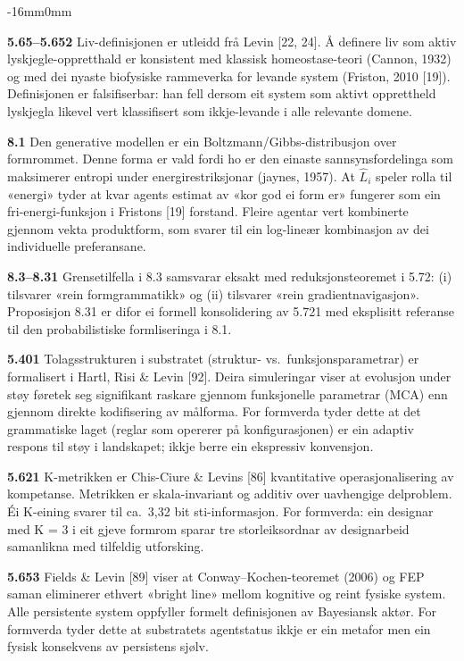 \documentclass[10pt,oneside]{book}
\newenvironment{widebody}{%
  \begin{adjustwidth}{-16mm}{0mm}%
}{%
  \end{adjustwidth}%
}
\begin{document}
\begin{widebody}
{\textbf{5.65--5.652} Liv-definisjonen er utleidd frå Levin [22, 24]. Å definere liv som aktiv lyskjegle-oppretthald er konsistent med klassisk homeostase-teori (Cannon, 1932) og med dei nyaste biofysiske rammeverka for levande system (Friston, 2010 [19]). Definisjonen er falsifiserbar: han fell dersom eit system som aktivt opprettheld lyskjegla likevel vert klassifisert som ikkje-levande i alle relevante domene.

\textbf{8.1} Den generative modellen er ein Boltzmann/Gibbs-distribusjon over formrommet. Denne forma er vald fordi ho er den einaste sannsynsfordelinga som maksimerer entropi under energirestriksjonar (jaynes, 1957). At \(\hat{L}_i\) speler rolla til «energi» tyder at kvar agents estimat av «kor god ei form er» fungerer som ein fri-energi-funksjon i Fristons [19] forstand. Fleire agentar vert kombinerte gjennom vekta produktform, som svarer til ein log-lineær kombinasjon av dei individuelle preferansane.

\textbf{8.3--8.31} Grensetilfella i 8.3 samsvarar eksakt med reduksjonsteoremet i 5.72: (i) tilsvarer «rein formgrammatikk» og (ii) tilsvarer «rein gradientnavigasjon». Proposisjon 8.31 er difor ei formell konsolidering av 5.721 med eksplisitt referanse til den probabilistiske formliseringa i 8.1.

\textbf{5.401} Tolagsstrukturen i substratet (struktur- vs.\ funksjonsparametrar) er formalisert i Hartl, Risi \& Levin [92]. Deira simuleringar viser at evolusjon under støy føretek seg signifikant raskare gjennom funksjonelle parametrar (MCA) enn gjennom direkte kodifisering av målforma. For formverda tyder dette at det grammatiske laget (reglar som opererer på konfigurasjonen) er ein adaptiv respons til støy i landskapet; ikkje berre ein ekspressiv konvensjon.

\textbf{5.621} K-metrikken er Chis-Ciure \& Levins [86] kvantitative operasjonalisering av kompetanse. Metrikken er skala-invariant og additiv over uavhengige delproblem. Éi K-eining svarer til ca.\ 3,32 bit sti-informasjon. For formverda: ein designar med K = 3 i eit gjeve formrom sparar tre storleiksordnar av designarbeid samanlikna med tilfeldig utforsking.

\textbf{5.653} Fields \& Levin [89] viser at Conway--Kochen-teoremet (2006) og FEP saman eliminerer ethvert «bright line» mellom kognitive og reint fysiske system. Alle persistente system oppfyller formelt definisjonen av Bayesiansk aktør. For formverda tyder dette at substratets agentstatus ikkje er ein metafor men ein fysisk konsekvens av persistens sjølv.

}
\end{widebody}
\end{document}
